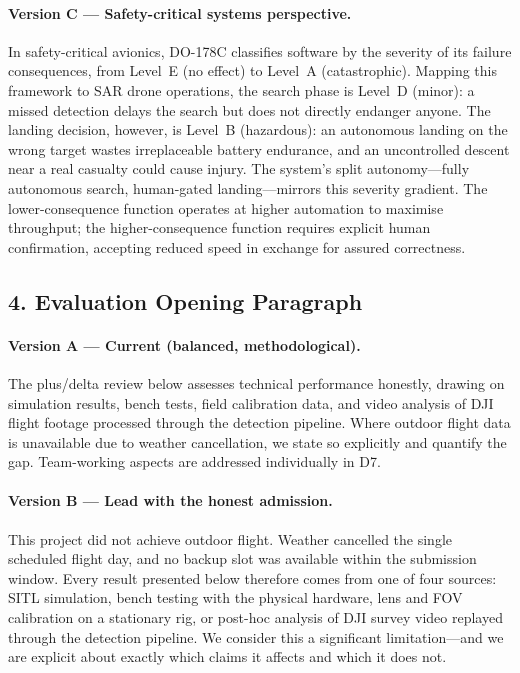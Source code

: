 \paragraph{{\color{olive} Version C --- Safety-critical systems perspective.}}
In safety-critical avionics, DO-178C classifies software by the severity of its failure consequences, from Level~E (no effect) to Level~A (catastrophic). Mapping this framework to SAR drone operations, the search phase is Level~D (minor): a missed detection delays the search but does not directly endanger anyone. The landing decision, however, is Level~B (hazardous): an autonomous landing on the wrong target wastes irreplaceable battery endurance, and an uncontrolled descent near a real casualty could cause injury. The system's split autonomy---fully autonomous search, human-gated landing---mirrors this severity gradient. The lower-consequence function operates at higher automation to maximise throughput; the higher-consequence function requires explicit human confirmation, accepting reduced speed in exchange for assured correctness.

\subsection*{4. Evaluation Opening Paragraph}

\paragraph{{\color{blue} Version A --- Current (balanced, methodological).}}
The plus/delta review below assesses technical performance honestly, drawing on simulation results, bench tests, field calibration data, and video analysis of DJI flight footage processed through the detection pipeline. Where outdoor flight data is unavailable due to weather cancellation, we state so explicitly and quantify the gap. Team-working aspects are addressed individually in D7.

\paragraph{{\color{red} Version B --- Lead with the honest admission.}}
This project did not achieve outdoor flight. Weather cancelled the single scheduled flight day, and no backup slot was available within the submission window. Every result presented below therefore comes from one of four sources: SITL simulation, bench testing with the physical hardware, lens and FOV calibration on a stationary rig, or post-hoc analysis of DJI survey video replayed through the detection pipeline. We consider this a significant limitation---and we are explicit about exactly which claims it affects and which it does not.

